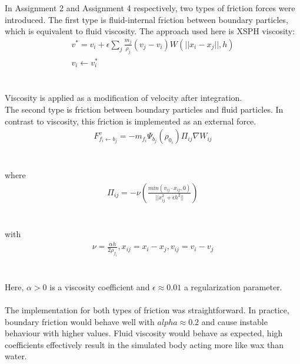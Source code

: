 \documentclass{ACGSeminar}
\begin{document}
In Assignment 2 and Assignment 4 respectively, two types of friction forces were introduced. 
The first type is fluid-internal friction between boundary particles, which is equivalent to fluid viscosity. The approach used here is XSPH viscosity:
\\
\begin{equation}
\begin{aligned}
v^* = v_i + \epsilon \sum_j \frac{m_j}{\rho_j}(v_j - v_i)W(||x_i - x_j||, h)\\
v_i \leftarrow v^*_i
\end{aligned}
\end{equation}\\
\\
Viscosity is applied as a modification of velocity after integration.\\
The second type is friction between boundary particles and fluid particles. In contrast to viscosity, this friction is implemented as an external force.
\\
\begin{equation}
\begin{aligned}
F^v_{f_i \leftarrow b_j} = -m_{f_i}\Psi_{b_j}(\rho_{0_i})\Pi_{ij}\nabla W_{ij}
\end{aligned}
\end{equation}\\
\\
where
\\
\begin{equation}
\begin{aligned}
\Pi_{ij} = -\nu(\frac{min(v_{ij} \cdot x_{ij}, 0)}{||x^2_{ij} + \epsilon h^2||})
\end{aligned}
\end{equation}\\
\\
with
\\
\begin{equation}
\begin{aligned}
\nu = \frac{\alpha h}{2\rho_{f_i}}, x_{ij} = x_i - x_j, v_{ij} = v_i - v_j
\end{aligned}
\end{equation}\\
\\
Here, \(\alpha > 0\) is a viscosity coefficient and \(\epsilon \approx 0.01\) a regularization parameter. \\
\\
The implementation for both types of friction was straightforward. In practice, boundary friction would behave well with \(alpha \approx 0.2\) and cause instable behaviour with higher values.
Fluid viscosity would behave as expected, high coefficients effectively result in the simulated body acting more like wax than water. 
\end{document}
